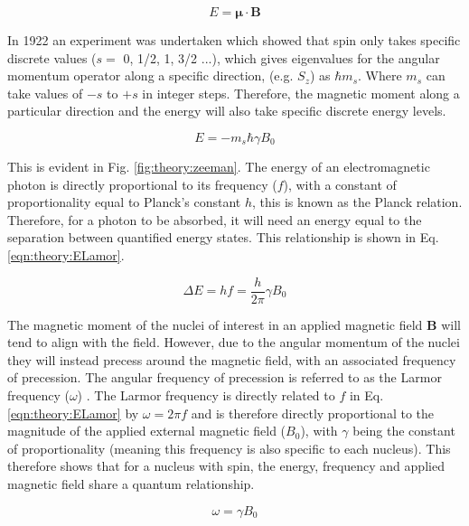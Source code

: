 \begin{equation}
    E = \mathbf{\mu} \cdot \mathbf{B}
\end{equation}

In 1922 an experiment was undertaken \cite{Gerlach1922DerMagnetfeld} which showed that spin only takes specific discrete values ($s =$ 0, 1/2, 1, 3/2 ...), which gives eigenvalues for the angular momentum operator along a specific direction, (e.g. $S_z$) as $\hbar m_s$. Where $m_s$ can take values of $-s$ to $+s$ in integer steps. Therefore, the magnetic moment along a particular direction and the energy will also take specific discrete energy levels.

\begin{equation}
    E = -m_s\hbar \gamma B_0
    \label{eqn:theory:ESpin}
\end{equation}

This is evident in Fig. \ref{fig:theory:zeeman}. The energy of an electromagnetic photon is directly proportional to its frequency ($f$), with a constant of proportionality equal to Planck's constant $h$, this is known as the Planck relation. Therefore, for a photon to be absorbed, it will need an energy equal to the separation between quantified energy states. This relationship is shown in Eq. \ref{eqn:theory:ELamor}.

\begin{equation}
    \Delta E = hf = \frac{h}{2\pi}\gamma B_0
    \label{eqn:theory:ELamor}
\end{equation}  

The magnetic moment of the nuclei of interest in an applied magnetic field $\mathbf{B}$ will tend to align with the field. However, due to the angular momentum of the nuclei they will instead precess around the magnetic field, with an associated frequency of precession. The angular frequency of precession is referred to as the Larmor frequency ($\omega$) \cite{Larmor1897LXIII.Ions}. The Larmor frequency is directly related to $f$ in Eq. \ref{eqn:theory:ELamor} by $\omega=2\pi f$ and is therefore directly proportional to the magnitude of the applied external magnetic field ($B_0$), with $\gamma$ being the constant of proportionality (meaning this frequency is also specific to each nucleus). This therefore shows that for a nucleus with spin, the energy, frequency and applied magnetic field share a quantum relationship. 

\begin{equation}
    \omega = \gamma B_0
    \label{eqn:theory:Lamor}
\end{equation}

